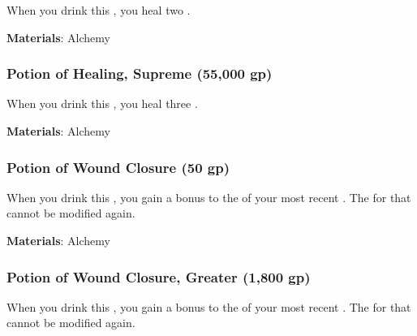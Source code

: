 When you drink this , you heal two .



\vspace{0.25em}
\textbf{Materials}: Alchemy


\lowercase{\hypertarget{item:Potion of Healing, Supreme}{}}\label{item:Potion of Healing, Supreme}
\hypertarget{item:Potion of Healing, Supreme}{\subsubsection{Potion of Healing, Supreme\hfill{} (55,000 gp)}}

When you drink this , you heal three .



\vspace{0.25em}
\textbf{Materials}: Alchemy


\lowercase{\hypertarget{item:Potion of Wound Closure}{}}\label{item:Potion of Wound Closure}
\hypertarget{item:Potion of Wound Closure}{\subsubsection{Potion of Wound Closure\hfill{} (50 gp)}}

When you drink this , you gain a  bonus to the  of your most recent .
The  for that  cannot be modified again.



\vspace{0.25em}
\textbf{Materials}: Alchemy


\lowercase{\hypertarget{item:Potion of Wound Closure, Greater}{}}\label{item:Potion of Wound Closure, Greater}
\hypertarget{item:Potion of Wound Closure, Greater}{\subsubsection{Potion of Wound Closure, Greater\hfill{} (1,800 gp)}}

When you drink this , you gain a  bonus to the  of your most recent .
The  for that  cannot be modified again.




